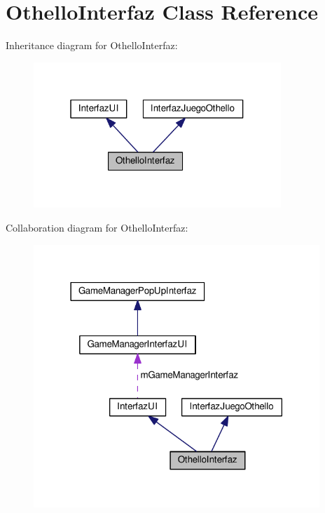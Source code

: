 \hypertarget{class_othello_interfaz}{}\section{Othello\+Interfaz Class Reference}
\label{class_othello_interfaz}


Inheritance diagram for Othello\+Interfaz\+:
\nopagebreak
\begin{figure}[H]
\begin{center}
\leavevmode
\includegraphics[width=265pt]{class_othello_interfaz__inherit__graph}
\end{center}
\end{figure}


Collaboration diagram for Othello\+Interfaz\+:
\nopagebreak
\begin{figure}[H]
\begin{center}
\leavevmode
\includegraphics[width=306pt]{class_othello_interfaz__coll__graph}
\end{center}
\end{figure}

